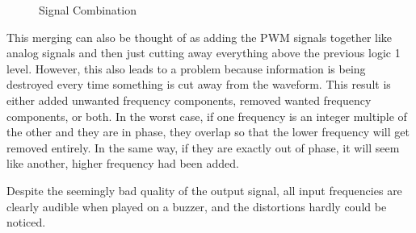 \begin{figure}[h!]
\begin{minipage}{0.49\textwidth}
  \vspace{7mm}
\end{minipage}
  \caption{Signal Combination}
  \label{fig:signalCombination}
\end{figure}

This merging can also be thought of as adding the PWM signals together like analog signals and then just cutting away everything above the previous logic 1 level. However, this also leads to a problem because information is being destroyed every time something is cut away from the waveform. This result is either added unwanted frequency components, removed wanted frequency components, or both. In the worst case, if one frequency is an integer multiple of the other and they are in phase, they overlap so that the lower frequency will get removed entirely. In the same way, if they are exactly out of phase, it will seem like another, higher frequency had been added.


Despite the seemingly bad quality of the output signal, all input frequencies are clearly audible when played on a buzzer, and the distortions hardly could be noticed.